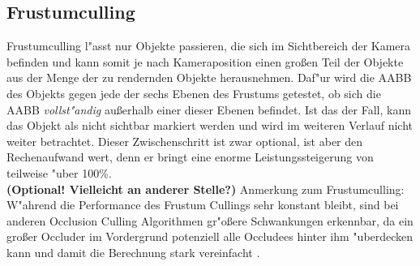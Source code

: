 \documentclass[journal]{vgtc}
\begin{document}
\subsection{Frustumculling}
Frustumculling l"asst nur Objekte passieren, die sich im Sichtbereich der Kamera befinden und kann somit je nach Kameraposition einen gro{\ss}en Teil der Objekte aus der Menge der zu rendernden Objekte herausnehmen. Daf"ur wird die AABB des Objekts gegen jede der sechs Ebenen des Frustums getestet, ob sich die AABB \textit{vollst"andig} au{\ss}erhalb einer dieser Ebenen befindet. Ist das der Fall, kann das Objekt als nicht sichtbar markiert werden und wird im weiteren Verlauf nicht weiter betrachtet. Dieser Zwischenschritt ist zwar optional, ist aber den Rechenaufwand wert, denn er bringt eine enorme Leistungssteigerung von teilweise "uber 100\%.\\
\textbf{(Optional! Vielleicht an anderer Stelle?)} Anmerkung zum Frustumculling: W"ahrend die Performance des Frustum Cullings sehr konstant bleibt, sind bei anderen Occlusion Culling Algorithmen gr"o\ss{}ere Schwankungen erkennbar, da ein gro\ss{}er Occluder im Vordergrund potenziell alle Occludees hinter ihm "uberdecken kann und damit die Berechnung stark vereinfacht \cite{MSOC}.\\
\end{document}
